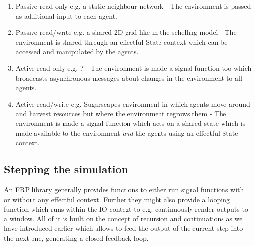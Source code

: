 \begin{enumerate}
	\item Passive read-only e.g. a static neighbour network - The environment is passed as additional input to each agent.
	\item Passive read/write e.g. a shared 2D grid like in the schelling model \cite{schelling_dynamic_1971} - The environment is shared through an effectful State context which can be accessed and manipulated by the agents.
	\item Active read-only e.g. ? - The environment is made a signal function too which broadcasts asynchronous messages about changes in the environment to all agents.
	\item Active read/write e.g. Sugarscapes environment in which agents move around and harvest resources but where the environment regrows them - The environment is made a signal function which acts on a shared state which is made available to the environment \textit{and} the agents using an effectful State context.
\end{enumerate}

\subsection{Stepping the simulation}
An FRP library generally provides functions to either run signal functions with or without any effectful context. Further they might also provide a looping function which runs within the IO context to e.g. continuously render outputs to a window. All of it is built on the concept of recursion and continuations as we have introduced earlier which allows to feed the output of the current step into the next one, generating a closed feedback-loop.


